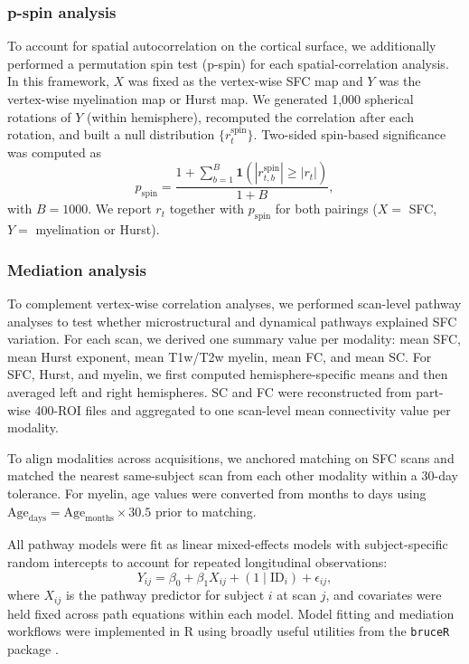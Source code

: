 \subsubsection{p-spin analysis}
To account for spatial autocorrelation on the cortical surface, we additionally performed a permutation spin test (p-spin) for each spatial-correlation analysis. In this framework, \(X\) was fixed as the vertex-wise SFC map and \(Y\) was the vertex-wise myelination map or Hurst map. We generated 1,000 spherical rotations of \(Y\) (within hemisphere), recomputed the correlation after each rotation, and built a null distribution \(\{r_t^{\mathrm{spin}}\}\). Two-sided spin-based significance was computed as
\[
p_{\mathrm{spin}}=\frac{1+\sum_{b=1}^{B}\mathbf{1}\!\left(|r_{t,b}^{\mathrm{spin}}|\ge |r_t|\right)}{1+B},
\]
with \(B=1000\). We report \(r_t\) together with \(p_{\mathrm{spin}}\) for both pairings (\(X=\) SFC, \(Y=\) myelination or Hurst).

\subsubsection{Mediation analysis}\label{subsec:mediation_pathway}
To complement vertex-wise correlation analyses, we performed scan-level pathway analyses to test whether microstructural and dynamical pathways explained SFC variation. For each scan, we derived one summary value per modality: mean SFC, mean Hurst exponent, mean T1w/T2w myelin, mean FC, and mean SC. For SFC, Hurst, and myelin, we first computed hemisphere-specific means and then averaged left and right hemispheres. SC and FC were reconstructed from part-wise 400-ROI files and aggregated to one scan-level mean connectivity value per modality.  

To align modalities across acquisitions, we anchored matching on SFC scans and matched the nearest same-subject scan from each other modality within a 30-day tolerance. For myelin, age values were converted from months to days using $\mathrm{Age}_{\mathrm{days}} = \mathrm{Age}_{\mathrm{months}} \times 30.5$ prior to matching.  

All pathway models were fit as linear mixed-effects models with subject-specific random intercepts to account for repeated longitudinal observations:
\[
Y_{ij} = \beta_0 + \beta_1 X_{ij} + (1 \mid \mathrm{ID}_i) + \epsilon_{ij},
\]
where $X_{ij}$ is the pathway predictor for subject $i$ at scan $j$, and covariates were held fixed across path equations within each model.
Model fitting and mediation workflows were implemented in R using broadly useful utilities from the \texttt{bruceR} package \cite{bao2021bruceR}.

